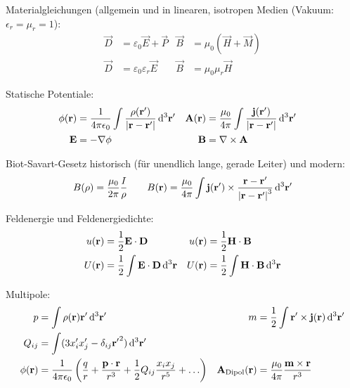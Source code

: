 Materialgleichungen (allgemein und in linearen, isotropen Medien (Vakuum: $\epsilon_r=\mu_r=1$):
\begin{align*}
	\vec {D} & =\varepsilon _{0}\vec {E}+\vec {P}        & \vec {B} & =\mu _{0}\left(\vec {H}+\vec {M}\right) \\
	\vec {D} & =\varepsilon _{0}\varepsilon _{r}\vec {E} & \vec {B} & =\mu _{0}\mu _{r}\vec {H}
\end{align*}

Statische Potentiale:
\begin{align*}
	\phi(\vec r)   & =\frac{1}{4\pi\epsilon_0}\int \frac{\rho(\vec r')}{\left|\vec r-\vec r'\right|}\diffa[3]{\vec r'} &
	\vec A(\vec r) & =\frac{\mu_0}{4\pi}\int \frac{\vec j(\vec r')}{\left|\vec r-\vec r'\right|}\diffa[3]{\vec r'}       \\
	\vec E         & =-\nabla \phi                                                                                     &
	\vec B         & =\nabla \times\vec A                                                                              &
\end{align*}

Biot-Savart-Gesetz historisch (für unendlich lange, gerade Leiter) und modern:
\begin{align*}
	B(\rho) = \frac{\mu_0}{2\pi}\frac{I}{\rho} \qquad B(\vec r)=\frac{\mu_0}{4\pi}\int\vec j(\vec r')\times \frac{\vec r-\vec r'}{\left|\vec r-\vec r'\right|^3}\diffa[3]{\vec r'}
\end{align*}

Feldenergie und Feldenergiedichte:
\begin{align*}
	u(\vec r) & =\frac{1}{2}\vec E\cdot \vec D                      & u(\vec r) & =\frac{1}{2}\vec H\cdot \vec B                       \\
	U(\vec r) & =\frac{1}{2}\int\vec E\cdot \vec D\diffa[3]{\vec r} & U(\vec r) & =\frac{1}{2}\int\vec H\cdot \vec B \diffa[3]{\vec r}
\end{align*}


Multipole:
\begin{align*}
	p            & = \int\rho(\vec r)\vec r'\diffa[3]{\vec r'}                                                                                   & m                       & =\frac{1}{2}\int \vec r'\times\vec j(\vec r)	\diffa[3]{\vec r'} \\
	Q_{ij}       & =\int (3x_i'x_j'-\delta_{ij} {\vec r'}^2)\diffa[3]{\vec r'}                                                                   &                         &                                                                \\
	\phi(\vec r) & = \frac{1}{4\pi\epsilon_0}\left(\frac{q}{r}+\frac{\vec p\cdot \vec r}{r^3}+\frac{1}{2}Q_{ij} \frac{x_ix_j}{r^5}+\ldots\right) & \vec A_\text{Dipol} (\vec r) & =\frac{\mu_0}{4\pi} \frac{\vec m\times \vec r}{r^3}
\end{align*}

